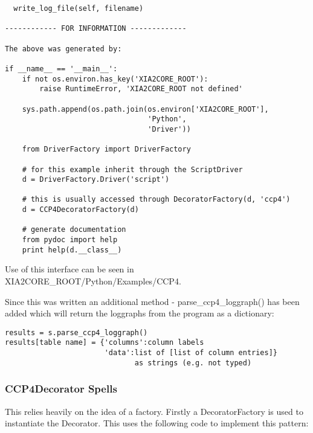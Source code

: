 \documentclass[a4paper, 11pt]{article}
\begin{document}
{\begin{verbatim}
  write_log_file(self, filename)

------------ FOR INFORMATION -------------

The above was generated by:

if __name__ == '__main__':
    if not os.environ.has_key('XIA2CORE_ROOT'):
        raise RuntimeError, 'XIA2CORE_ROOT not defined'

    sys.path.append(os.path.join(os.environ['XIA2CORE_ROOT'],
                                 'Python',
                                 'Driver'))
    
    from DriverFactory import DriverFactory    

    # for this example inherit through the ScriptDriver
    d = DriverFactory.Driver('script')

    # this is usually accessed through DecoratorFactory(d, 'ccp4')
    d = CCP4DecoratorFactory(d)

    # generate documentation
    from pydoc import help
    print help(d.__class__)
\end{verbatim}
}

\noindent
Use of this interface can be seen in XIA2CORE\_ROOT/Python/Examples/CCP4.

Since this was written an additional method - parse\_ccp4\_loggraph() has
been added which will return the loggraphs from the program as a dictionary:

{
\tiny
\begin{verbatim}
results = s.parse_ccp4_loggraph()
results[table name] = {'columns':column labels
                       'data':list of [list of column entries]}
                              as strings (e.g. not typed)
\end{verbatim}
}

\subsubsection{CCP4Decorator Spells}

This relies heavily on the idea of a factory. Firstly a DecoratorFactory is
used to instantiate the Decorator. This uses the following code to implement
this pattern:
\end{document}

